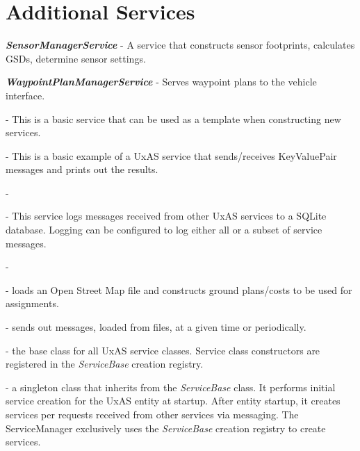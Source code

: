 \section{Additional Services}
\begin{description}
\item
  \textbf{\textit{SensorManagerService}} - A service that constructs
  sensor footprints, calculates GSDs, determine sensor settings.
\item
  \textbf{\textit{WaypointPlanManagerService}} - Serves waypoint plans to
  the vehicle interface.
	\item[\textbf{\textit{00\_ServiceTemplate}}] - This is a basic service that can be used as a template when constructing new services.
	\item[\textbf{\textit{01\_HelloWorld}}] - This is a basic example of a UxAS service that sends/receives KeyValuePair messages and prints out the results.
	\item[\textbf{\textit{BatchSummaryService}}] - 
	\item[\textbf{\textit{MessageLoggerDataService}}] - This service logs messages received from other UxAS services to a SQLite database.  Logging can be configured to log either all or a subset of service messages.
	\item[\textbf{\textit{OperatingRegionStateService}}] - 
	\item[\textbf{\textit{OsmPlannerService}}] - loads an Open Street Map file and constructs ground plans/costs to be used for assignments.
	\item[\textbf{\textit{SendMessagesService}}] - sends out messages, loaded from files, at a given time or periodically.
	\item[\textbf{\textit{ServiceBase}}] - the base class for all UxAS service classes. Service class constructors are registered in the \textit{ServiceBase} creation registry.
	\item[\textbf{\textit{ServiceManager}}] - a singleton class that inherits from the  \textit{ServiceBase}  class. It performs initial service creation for the UxAS entity at startup. After entity startup, it creates services per requests received from other services via messaging.  The ServiceManager  exclusively uses the  \textit{ServiceBase} creation registry to create services.
\end{description}


